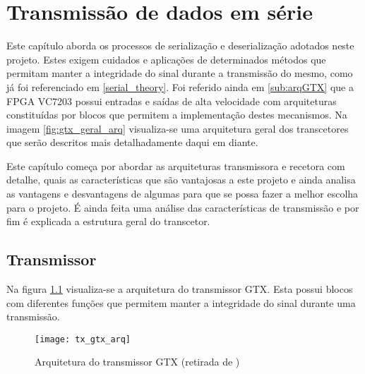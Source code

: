
\chapter{Transmissão de dados em série}\label{chap:chap4}


Este capítulo aborda os processos de serialização e deserialização adotados neste projeto. Estes exigem cuidados e aplicações de determinados métodos que permitam manter a integridade do sinal durante a transmissão do mesmo, como já foi referenciado em \ref{serial_theory}. Foi referido ainda em \ref{sub:arqGTX} que a FPGA VC7203 possui entradas e saídas de alta velocidade com arquiteturas constituídas por blocos que permitem a implementação destes mecanismos. Na imagem \ref{fig:gtx_geral_arq} visualiza-se uma arquitetura geral dos transcetores que serão descritos mais detalhadamente daqui em diante.

Este capítulo começa por abordar as arquiteturas transmissora e recetora com detalhe, quais as características que são vantajosas a este projeto e ainda analisa as vantagens e desvantagens de algumas para que se possa fazer a melhor escolha para o projeto. É ainda feita uma análise das características de transmissão e por fim é explicada a estrutura geral do transcetor.

\section{Transmissor} \label{sec:tx_gtx}

Na figura \ref{fig:gtx_tx_arq} visualiza-se a arquitetura do transmissor GTX.  Esta possui blocos com diferentes funções que permitem manter a integridade do sinal durante uma transmissão.

\begin{figure}[h!]
	\begin{center}
		\leavevmode
		\texttt{[image: tx\_gtx\_arq]}
		\caption[Arquitetura do transmissor GTX]{Arquitetura do transmissor GTX (retirada de \cite{R011})}
		\label{fig:gtx_tx_arq}
	\end{center}
\end{figure}

